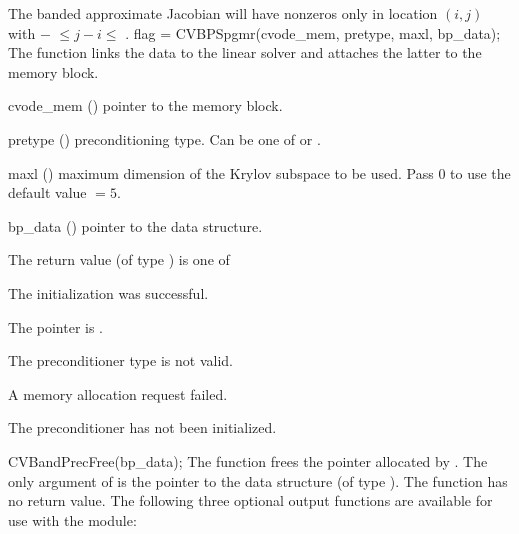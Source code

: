 {
  The banded approximate Jacobian will have nonzeros only in location $(i,j)$
  with $-$ $\leq j-i \leq$ .
}
{
  flag = CVBPSpgmr(cvode\_mem, pretype, maxl, bp\_data);
}
{
  The function  links the {\cvbandpre} data to the
  {\cvspgmr} linear solver and attaches the latter to the {\cvodes}
  memory block.
}
{
  \begin{args}
  \item[cvode\_mem] ()
    pointer to the {\cvodes} memory block.
  \item[pretype] ()
    preconditioning type. Can be one of  or .
  \item[maxl] ()
    maximum dimension of the Krylov subspace to be used. Pass $0$ to use the 
    default value $=5$.
  \item[bp\_data] ()
    pointer to the {\cvbandpre} data structure.
  \end{args}
}
{
  The return value  (of type ) is one of
  \begin{args}
  \item[\Id{SUCCESS}] 
    The {\cvspgmr} initialization was successful.
  \item[\Id{LIN\_NO\_MEM}]
    The  pointer is .
  \item[\Id{LIN\_ILL\_INPUT}]
    The preconditioner type  is not valid.
  \item[\Id{LMEM\_FAIL}]
    A memory allocation request failed.
  \item[\Id{BP\_NO\_DATA}]
    The {\cvbandpre} preconditioner has not been initialized.
  \end{args}
}
{}
{
  CVBandPrecFree(bp\_data);
}
{
  The function  frees the pointer allocated by
  .
}
{
  The only argument of  is the pointer to the {\cvbandpre} 
  data structure (of type ).
}
{
  The function  has no return value.
}
{}
The following three optional output functions are available for use with 
the {\cvbandpre} module:
